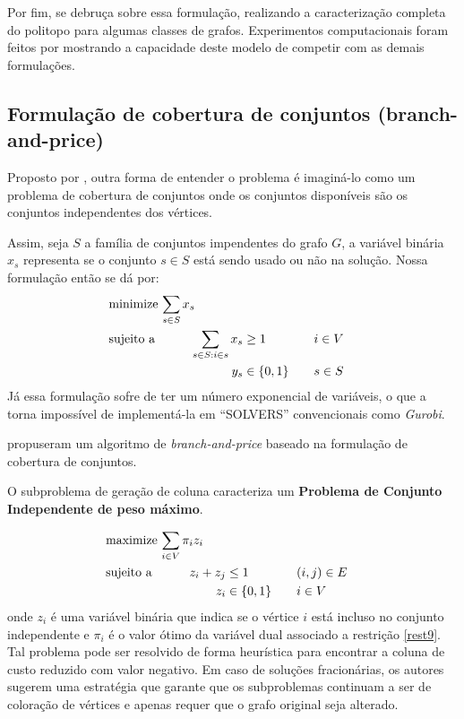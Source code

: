 \documentclass[11pt]{article}
\begin{document}
Por fim, \autocite{Campelo2008AsymmetricRepresentativesFormulation} se debruça sobre essa formulação, realizando a caracterização completa do politopo para algumas classes de grafos.
Experimentos computacionais foram feitos por \autocite{Jabrayilov2018NewIntegerLinear} mostrando a capacidade deste modelo de competir com as demais formulações.
\subsection{Formulação de cobertura de conjuntos (branch-and-price)}
\label{sec:orge1d7fd3}
Proposto por \textcite{Mehrotra1996ColumnGenerationApproach}, outra forma de entender o problema é imaginá-lo como um problema de cobertura de conjuntos onde os conjuntos disponíveis são os conjuntos independentes dos vértices.

Assim, seja \(S\) a família de conjuntos impendentes do grafo \(G\), a variável binária \(x_s\) representa se o conjunto \(s \in S\) está sendo usado ou não na solução. Nossa formulação então se dá por:
\begin{alignat}{4}
& \omit\rlap{minimize  $\displaystyle \sum_{s \in S} x_s$} \nonumber \\
& \mbox{sujeito a}&& \quad & \sum_{s \in S: i \in s} x_{s}&\geq 1 & \quad & i \in V \label{rest9} \\
&                 &&   & y_s       & \in \{0,1\} &    & s \in S \nonumber
\end{alignat}
Já essa formulação sofre de ter um número exponencial de variáveis, o que a torna impossível de implementá-la em ``SOLVERS'' convencionais como \emph{Gurobi}.

\textcite{Mehrotra1996ColumnGenerationApproach} propuseram um algoritmo de \emph{branch-and-price}  baseado na formulação de cobertura de conjuntos.

O subproblema de geração de coluna caracteriza um \textbf{Problema de Conjunto Independente de peso máximo}.

\begin{alignat*}{4}
& \omit\rlap{maximize  $\displaystyle \sum_{i \in V} \pi_i z_i$} \\
& \mbox{sujeito a}&& \quad & z_i + z_j &\leq 1 & \quad & (i,j) \in E \\
&                 &&   & z_i       & \in \{0,1\} &    & i \in V
\end{alignat*}
onde \(z_i\) é uma variável binária que indica se o vértice \(i\) está incluso no conjunto independente e \(\pi_i\) é o valor ótimo da variável dual associado a restrição \ref{rest9}.
Tal problema pode ser resolvido de forma heurística para encontrar a coluna de custo reduzido com valor negativo.
Em caso de soluções fracionárias, os autores sugerem uma estratégia  que garante que os subproblemas continuam a ser de coloração de vértices e apenas requer que o grafo original seja alterado.
\end{document}
